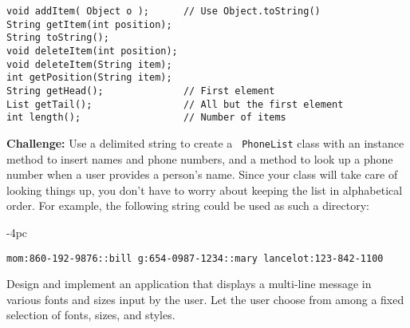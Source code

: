 \begin{EXRtwo}
\begin{jjjlisting}
\begin{lstlisting}
void addItem( Object o );      // Use Object.toString()
String getItem(int position);
String toString();
void deleteItem(int position);
void deleteItem(String item);
int getPosition(String item);
String getHead();              // First element
List getTail();                // All but the first element
int length();                  // Number of items
\end{lstlisting}
\end{jjjlisting}

\item {\bf Challenge:} Use a delimited string to create a {\tt
PhoneList} class with an instance method to insert names and phone
numbers, and a method to look up a phone number when a user provides a
person's name.  Since your class will take care of looking things up,
you don't have to worry about keeping the list in alphabetical order.
For example, the following string could be used as such a directory:

\begin{jjjlistingleft}[30pc]{-4pc}
\begin{lstlisting}
mom:860-192-9876::bill g:654-0987-1234::mary lancelot:123-842-1100
\end{lstlisting}
\end{jjjlistingleft}

\item  Design and implement an application that
displays a multi-line message in various fonts and sizes input by the
user.   Let the user choose from among a fixed selection of fonts,
sizes, and styles.




\end{EXRtwo}

